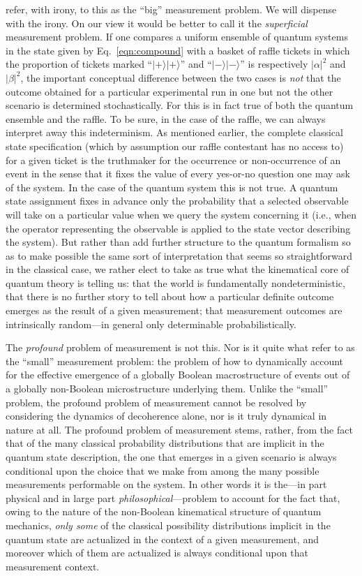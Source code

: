 \citet[]{Bub and Pitowsky 2010} refer, with irony, to this as the ``big'' measurement problem. We will dispense with the irony. On our view it would be better to call it the \emph{superficial} measurement problem. If one compares a uniform ensemble of quantum systems in the state given by Eq.\ \eqref{eqn:compound} with a basket of raffle tickets in which the proportion of tickets marked ``$|+\rangle|+\rangle$'' and ``$|-\rangle|-\rangle$'' is respectively $|\alpha|^2$ and $|\beta|^2$, the important conceptual difference between the two cases is \emph{not} that the outcome obtained for a particular experimental run in one but not the other scenario is determined stochastically. For this is in fact true of both the quantum ensemble and the raffle. To be sure, in the case of the raffle, we can always interpret away this indeterminism. As mentioned earlier, the complete classical state specification (which by assumption our raffle contestant has no access to) for a given ticket is the truthmaker for the occurrence or non-occurrence of an event in the sense that it fixes the value of every yes-or-no question one may ask of the system. In the case of the quantum system this is not true. A quantum state assignment fixes in advance only the probability that a selected observable will take on a particular value when we query the system concerning it (i.e., when the operator representing the observable is applied to the state vector describing the system). But rather than add further structure to the quantum formalism so as to make possible the same sort of interpretation that seems so straightforward in the classical case, we rather elect to take as true what the kinematical core of quantum theory is telling us: that the world is fundamentally nondeterministic, that there is no further story to tell about how a particular definite outcome emerges as the result of a given measurement; that measurement outcomes are intrinsically random---in general only determinable probabilistically.

The \emph{profound} problem of measurement is not this. Nor is it quite what \citet[]{Bub and Pitowsky 2010} refer to as the ``small'' measurement problem: the problem of how to dynamically account for the effective emergence of a globally Boolean macrostructure of events out of a globally non-Boolean microstructure underlying them. Unlike the ``small'' problem, the profound problem of measurement cannot be resolved by considering the dynamics of decoherence alone, nor is it truly dynamical in nature at all. The profound problem of measurement stems, rather, from the fact that of the many classical probability distributions that are implicit in the quantum state description, the one that emerges in a given scenario is always conditional upon the choice that we make from among the many possible measurements performable on the system. In other words it is the---in part physical and in large part \emph{philosophical}---problem to account for the fact that, owing to the nature of the non-Boolean kinematical structure of quantum mechanics, \emph{only some} of the classical possibility distributions implicit in the quantum state are actualized in the context of a given measurement, and moreover which of them are actualized is always conditional upon that measurement context.

